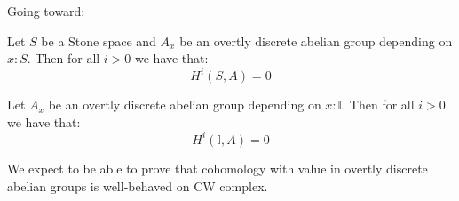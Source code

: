 Going toward:

\begin{theorem}
Let $S$ be a Stone space and $A_x$ be an overtly discrete abelian group depending on $x:S$. Then for all $i>0$ we have that:
\[H^i(S,A) = 0\]
\end{theorem}

\begin{proposition}
Let $A_x$ be an overtly discrete abelian group depending on $x:\mathbb{I}$. Then for all $i>0$ we have that:
\[H^i(\mathbb I,A) = 0\]
\end{proposition}

We expect to be able to prove that cohomology with value in overtly discrete abelian groups is well-behaved on CW complex.